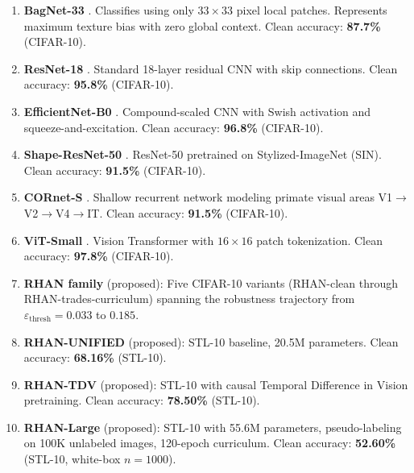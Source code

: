 \documentclass[12pt,a4paper]{article}
\begin{document}
\begin{enumerate}[leftmargin=1.5em]

  \item \textbf{BagNet-33} \citep{brendel2019approximating}.
        Classifies using only $33{\times}33$ pixel local patches.
        Represents maximum texture bias with zero global context.
        Clean accuracy: \textbf{87.7\%} (CIFAR-10).

  \item \textbf{ResNet-18} \citep{he2016deep}.
        Standard 18-layer residual CNN with skip connections.
        Clean accuracy: \textbf{95.8\%} (CIFAR-10).

  \item \textbf{EfficientNet-B0} \citep{tan2019efficientnet}.
        Compound-scaled CNN with Swish activation and squeeze-and-excitation.
        Clean accuracy: \textbf{96.8\%} (CIFAR-10).

  \item \textbf{Shape-ResNet-50} \citep{geirhos2019imagenet}.
        ResNet-50 pretrained on Stylized-ImageNet (SIN).
        Clean accuracy: \textbf{91.5\%} (CIFAR-10).

  \item \textbf{CORnet-S} \citep{kubilius2019brain}.
        Shallow recurrent network modeling primate visual areas
        V1$\to$V2$\to$V4$\to$IT. Clean accuracy: \textbf{91.5\%} (CIFAR-10).

  \item \textbf{ViT-Small} \citep{dosovitskiy2020image}.
        Vision Transformer with $16{\times}16$ patch tokenization.
        Clean accuracy: \textbf{97.8\%} (CIFAR-10).

  \item \textbf{RHAN family} (proposed): Five CIFAR-10 variants
        (RHAN-clean through RHAN-trades-curriculum) spanning the
        robustness trajectory from $\varepsilon_{\text{thresh}}{=}0.033$ to
        $0.185$.

  \item \textbf{RHAN-UNIFIED} (proposed): STL-10 baseline, 20.5M parameters.
        Clean accuracy: \textbf{68.16\%} (STL-10).

  \item \textbf{RHAN-TDV} (proposed): STL-10 with causal Temporal Difference
        in Vision pretraining. Clean accuracy: \textbf{78.50\%} (STL-10).

  \item \textbf{RHAN-Large} (proposed): STL-10 with 55.6M parameters,
        pseudo-labeling on 100K unlabeled images, 120-epoch curriculum.
        Clean accuracy: \textbf{52.60\%} (STL-10, white-box $n{=}1000$).

\end{enumerate}
\end{document}
